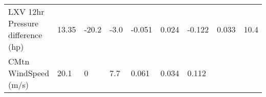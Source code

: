 \documentclass[11pt]{article}
\begin{document}
\begin{longtable}[]{@{}lllllllll@{}}
\begin{minipage}[t]{0.25\columnwidth}
LXV 12hr Pressure difference (hp)\strut
\end{minipage} & \begin{minipage}[t]{0.06\columnwidth}\raggedright\strut
13.35\strut
\end{minipage} & \begin{minipage}[t]{0.06\columnwidth}\raggedright\strut
-20.2\strut
\end{minipage} & \begin{minipage}[t]{0.08\columnwidth}\raggedright\strut
-3.0\strut
\end{minipage} & \begin{minipage}[t]{0.05\columnwidth}\raggedright\strut
-0.051\strut
\end{minipage} & \begin{minipage}[t]{0.07\columnwidth}\raggedright\strut
0.024\strut
\end{minipage} & \begin{minipage}[t]{0.06\columnwidth}\raggedright\strut
-0.122\strut
\end{minipage} & \begin{minipage}[t]{0.06\columnwidth}\raggedright\strut
0.033\strut
\end{minipage} & \begin{minipage}[t]{0.07\columnwidth}\raggedright\strut
10.4\strut
\end{minipage}\tabularnewline
\begin{minipage}[t]{0.25\columnwidth}\raggedright\strut
CMtn WindSpeed (m/s)\strut
\end{minipage} & \begin{minipage}[t]{0.06\columnwidth}\raggedright\strut
20.1\strut
\end{minipage} & \begin{minipage}[t]{0.06\columnwidth}\raggedright\strut
0\strut
\end{minipage} & \begin{minipage}[t]{0.08\columnwidth}\raggedright\strut
7.7\strut
\end{minipage} & \begin{minipage}[t]{0.05\columnwidth}\raggedright\strut
0.061\strut
\end{minipage} & \begin{minipage}[t]{0.07\columnwidth}\raggedright\strut
0.034\strut
\end{minipage} & \begin{minipage}[t]{0.06\columnwidth}\raggedright\strut
0.112\strut
\end{minipage} & \begin{minipage}[t]{0.06\columnwidth}\raggedright\strut

\end{minipage}
\end{longtable}
\end{document}
